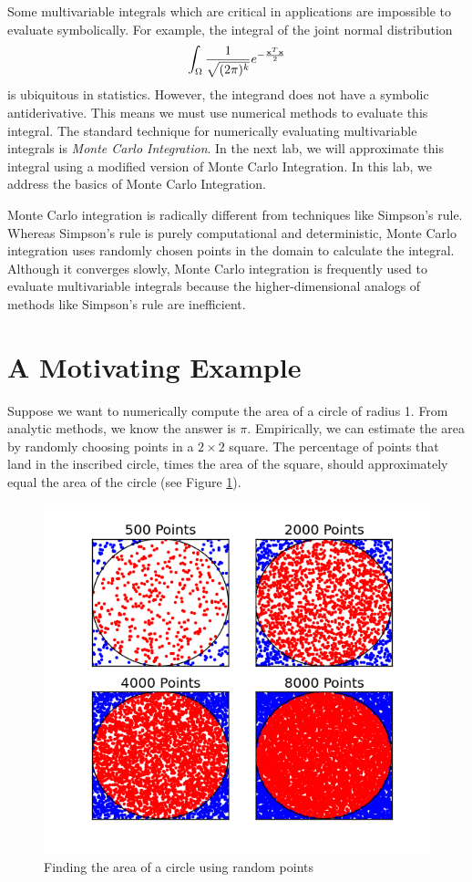 
Some multivariable integrals which are critical in applications are impossible to evaluate symbolically.
For example, the integral of the joint normal distribution
\[
\int_{\Omega} \frac{1}{\sqrt{(2 \pi)^k}} e^{- \frac{\bold{x}^T\bold{x}}{2}}
\]
is ubiquitous in statistics.
However, the integrand does not have a symbolic antiderivative.
This means we must use numerical methods to evaluate this integral. The standard technique for numerically evaluating multivariable integrals is \emph{Monte Carlo Integration}. In the next lab, we will approximate this integral using a modified version of Monte Carlo Integration. In this lab, we address the basics of Monte Carlo Integration.

Monte Carlo integration is radically different from techniques like Simpson's rule. Whereas Simpson's rule is purely computational and deterministic, Monte Carlo integration uses randomly chosen points  in the domain to calculate the integral.
Although it converges slowly, Monte Carlo integration is frequently used to evaluate multivariable integrals because the higher-dimensional analogs of methods like Simpson's rule are inefficient. 

\section*{A Motivating Example}
Suppose we want to numerically compute the area of a circle of radius 1.
From analytic methods, we know the answer is $\pi$.
Empirically, we can estimate the area by randomly choosing points in a $2 \times 2$ square.
The percentage of points that land in the inscribed circle, times the area of the square, should approximately equal the area of the circle (see Figure \ref{fig:MCCircle}).

\begin{figure}
\includegraphics[width=.7\textwidth]{MC.png}
\caption{Finding the area of a circle using random points}
\label{fig:MCCircle}
\end{figure}

